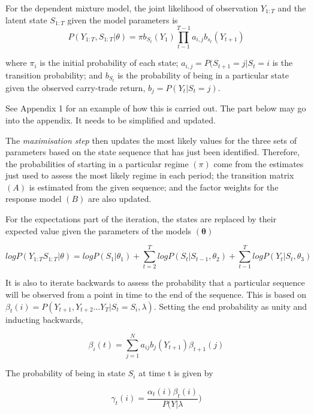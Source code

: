 \documentclass[12pt, a4paper, oneside]{article} %
\begin{document}
For the dependent mixture model, the joint likelihood of observation $Y_{1:T}$ and the latent state $S_{1:T}$ given the model parameters is 
\begin{equation}
P(Y_{1:T}, S_{1:T}|\theta) = \pi b_{S_t}(Y_1)\prod_{t-1}^{T-1} a_{i,j}b_{s_t}(Y_{t+1})
\end{equation}

where $\pi_i$ is the initial probability of each state; $a_{i,j} = P(S_{t+1} = j| S_t = i$ is the transition probability; and $b_{S_t}$ is the probability of being in a particular state given the observed carry-trade return, $b_j = P(Y_t|S_t = j)$.

See Appendix 1 for an example of how this is carried out.  The part below may go into the appendix. It needs to be simplified and updated.    

The \emph{maximisation step} then updates the most likely values for the three sets of parameters based on the state sequence that has just been identified. Therefore, the probabilities of starting in a particular regime $(\pi)$ come from the estimates just used to assess the most likely regime in each period; the transition matrix $(A)$ is estimated from the given sequence; and the factor weights for the response model $(B)$ are also updated. 

For the expectations part of the iteration, the states are replaced by their expected value given the parameters of the models $(\mathbf{\theta})$

\begin{equation} 
log P(Y_{1:T}S_{1:T}| \theta) = log P(S_1|\theta_1) + \sum_{t=2}^T log P(S_t|S_{t-1}, \theta_2) + \sum_{t-1}^T log P(Y_t|S_t, \theta_3)
\end{equation}

It is also to iterate backwards to assess the probability that a particular sequence will be observed from a point in time to the end of the sequence.  This is based on $\beta_t(i) = P(Y_{t+1}, Y_{t+2}\dots Y_T| S_t = S_i, \lambda)$. Setting the end probability as unity and inducting backwards, 

\begin{equation} 
\beta_i(t) = \sum_{j = 1}^N a_{ij}b_j(Y_{t+1})\beta_{t+1}(j)
\end{equation}

The probability of being in state $S_i$ at time t is given by 

\begin{equation}
\gamma_t(i) = \frac{\alpha_t(i)\beta_t(i)}{P(Y|\lambda})
\end{equation}
\end{document}
